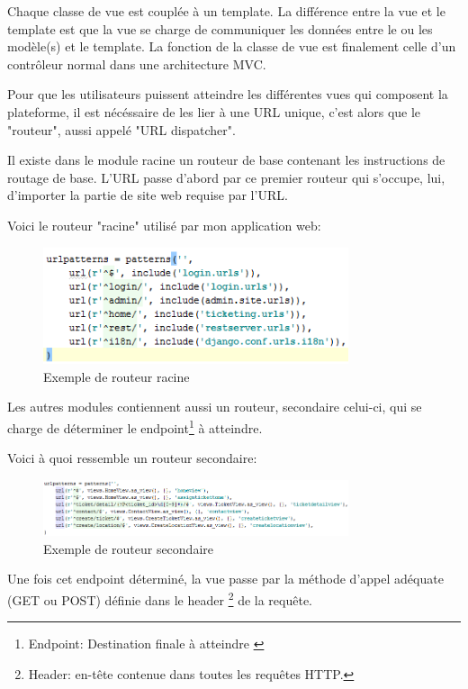 \documentclass[12pt,table,a4paper]{report}
\begin{document}
Chaque classe de vue est couplée à un template. La différence entre la vue et le template est que la vue se charge de communiquer les données entre le ou les modèle(s) et le template. La fonction de la classe de vue est finalement celle d'un contrôleur normal dans une architecture MVC.

Pour que les utilisateurs puissent atteindre les différentes vues qui composent la plateforme, il est nécéssaire de les lier à une URL unique, c'est alors que le "routeur", aussi appelé "URL dispatcher".

Il existe dans le module racine un routeur de base contenant les instructions de routage de base. L'URL passe d'abord par ce premier routeur qui s'occupe, lui, d'importer la partie de site web requise par l'URL.

Voici le routeur "racine" utilisé par mon application web:
\begin{figure}
	\centering
		\includegraphics[width=0.8\textwidth,natwidth=377,natheight=144]{images/ticket-routeur-racine.png}
	\caption{Exemple de routeur racine}
	\label{fig:ticket-routeur-racine}
\end{figure}

Les autres modules contiennent aussi un routeur, secondaire celui-ci, qui se charge de déterminer le endpoint\footnote{Endpoint: Destination finale à atteindre \label{endpointFootnote}} à atteindre.

Voici à quoi ressemble un routeur secondaire:
\begin{figure}
	\centering
		\includegraphics[width=0.8\textwidth,natwidth=737,natheight=136]{images/ticket-routeur-secondaire.png}
	\caption{Exemple de routeur secondaire}
	\label{fig:ticket-routeur-secondaire}
\end{figure}

Une fois cet endpoint déterminé, la vue passe par la méthode d'appel adéquate (GET ou POST) définie dans le header \footnote{Header: en-tête contenue dans toutes les requêtes HTTP.} de la requête.
\end{document}
